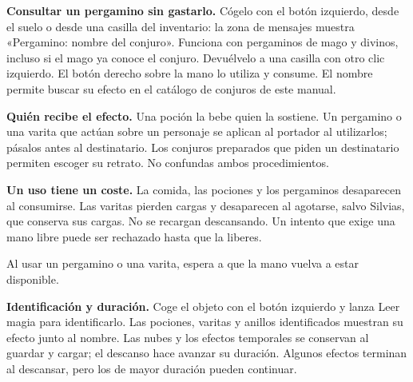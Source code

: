 
\textbf{Consultar un pergamino sin gastarlo.} Cógelo con el botón izquierdo, desde el suelo o desde una casilla del inventario: la zona de mensajes muestra «Pergamino: nombre del conjuro». Funciona con pergaminos de mago y divinos, incluso si el mago ya conoce el conjuro. Devuélvelo a una casilla con otro clic izquierdo. El botón derecho sobre la mano lo utiliza y consume. El nombre permite buscar su efecto en el catálogo de conjuros de este manual.

\textbf{Quién recibe el efecto.} Una poción la bebe quien la sostiene. Un pergamino o una varita que actúan sobre un personaje se aplican al portador al utilizarlos; pásalos antes al destinatario. Los conjuros preparados que piden un destinatario permiten escoger su retrato. No confundas ambos procedimientos.

\textbf{Un uso tiene un coste.} La comida, las pociones y los pergaminos desaparecen al consumirse. Las varitas pierden cargas y desaparecen al agotarse, salvo Silvias, que conserva sus cargas. No se recargan descansando. Un intento que exige una mano libre puede ser rechazado hasta que la liberes.

Al usar un pergamino o una varita, espera a que la mano vuelva a estar disponible.

\textbf{Identificación y duración.} Coge el objeto con el botón izquierdo y lanza Leer magia para identificarlo. Las pociones, varitas y anillos identificados muestran su efecto junto al nombre. Las nubes y los efectos temporales se conservan al guardar y cargar; el descanso hace avanzar su duración. Algunos efectos terminan al descansar, pero los de mayor duración pueden continuar.

